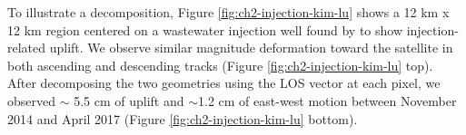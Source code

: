 To illustrate a decomposition, Figure \ref{fig:ch2-injection-kim-lu} shows a 12 km x 12 km region centered on a wastewater injection well found by \cite{Kim2018AssociationLocalizedGeohazards} to show injection-related uplift. We observe similar magnitude deformation toward the satellite in both ascending and descending tracks (Figure \ref{fig:ch2-injection-kim-lu} top). After decomposing the two geometries using the LOS vector at each pixel, we observed $\sim$ 5.5 cm of uplift and $\sim$1.2 cm of east-west motion between November 2014 and April 2017 (Figure \ref{fig:ch2-injection-kim-lu} bottom). 




%
%
%


